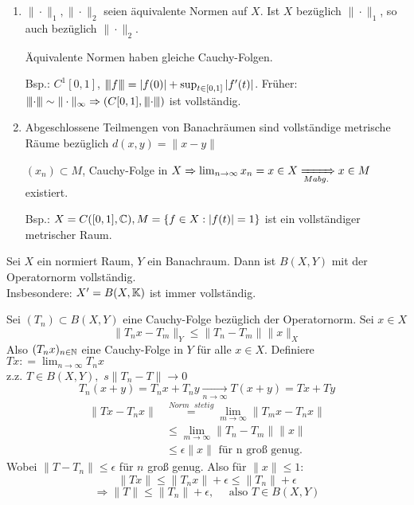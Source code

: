 \begin{bemerkung}
	\begin{enumerate}[label=\alph*\upshape)]
		\item $\| \cdot \|_{1}, \| \cdot \|_{2}$ seien äquivalente Normen auf $X$. Ist $X$ bezüglich $\| \cdot \|_{1}$, so auch bezüglich $\| \cdot \|_{2}$.
			\begin{beweis}
				Äquivalente Normen haben gleiche Cauchy-Folgen.
			\end{beweis}
			Bsp.: $C^{1}[0, 1]$, ${\left\vert\kern-0.25ex\left\vert\kern-0.25ex\left\vert f\right\vert\kern-0.25ex\right\vert\kern-0.25ex\right\vert} = |f(0)| + \sup_{t \in [0, 1]} | f'(t) |$. Früher: ${\left\vert\kern-0.25ex\left\vert\kern-0.25ex\left\vert\cdot\right\vert\kern-0.25ex\right\vert\kern-0.25ex\right\vert} \sim \| \cdot \|_{\infty} \Rightarrow \left( C[0, 1], {\left\vert\kern-0.25ex\left\vert\kern-0.25ex\left\vert\cdot\right\vert\kern-0.25ex\right\vert\kern-0.25ex\right\vert} \right)$ ist vollständig.
		\item Abgeschlossene Teilmengen von 	Banachräumen sind vollständige metrische Räume bezüglich $d(x, y) = \| x - y\|$
			\begin{beweis}
				$(x_{n}) \subset M$, Cauchy-Folge in $X \Rightarrow \lim_{n \rightarrow \infty} x_{n} = x \in X \xRightarrow[M abg.]{} x \in M$ existiert.	
			\end{beweis}
			Bsp.: $X = C([0, 1], \mathbb{C}), M = \{ f \in X: |f ( t )| = 1 \}$ ist ein vollständiger metrischer Raum.
	\end{enumerate}
\end{bemerkung}



\begin{satz}
	Sei $X$ ein normiert Raum, $Y$ ein Banachraum.
	Dann ist $B(X, Y)$ mit der Operatornorm vollständig. \\
	Insbesondere: $X' = B(X, \mathbb{K})$ ist immer  vollständig.
\end{satz}
\begin{beweis}
	Sei $(T_{n}) \subset B(X, Y)$ eine Cauchy-Folge bezüglich der Operatornorm. Sei $x \in X$
	\[ \| T_{n} x - T_{m} \|_{Y} \leq \| T_{n} - T_{m} \| \|x\|_{X} \]
	Also $(T_{n}x)_{n \in \mathbb{N}}$ eine Cauchy-Folge in $Y$ für alle $x \in X$. Definiere $T x : = \lim_{n \rightarrow \infty} T_{n} x$ \\
	z.z. $T \in B(X, Y),$ $s\| T_{n} - T \| \rightarrow 0$ \\
	\[ T_{n} (x + y)  = T_{n} x + T_{n} y \xrightarrow[n \rightarrow \infty]{} T(x + y) = Tx + Ty \]
	\begin{align*}
		\| Tx - T_{n}x \| & \overset{Norm \text{ } stetig}{=} \lim_{m \rightarrow \infty} \| T_{m} x - T_{n} x \| \\
		 & \leq \lim_{m \rightarrow \infty} \| T_{n} - T_{m} \| \| x \| \\
		 & \leq \epsilon \| x \| \text{ für n gro{\ss} genug.}
	\end{align*}
	Wobei $\| T - T_{n} \| \leq \epsilon$ für $n$ gro{\ss} genug.
	Also für $\| x \| \leq 1$:
	\[ \| T x \| \leq \| T_{n} x \| + \epsilon \leq \| T_{n} \| + \epsilon  \]
	\[ \Rightarrow \| T \| \leq \| T_{n} \| + \epsilon, \quad \text{ also } T \in B(X, Y) \]
\end{beweis}

